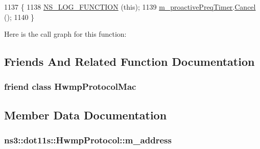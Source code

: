 \begin{DoxyCode}
1137 \{
1138   \hyperlink{log-macros-disabled_8h_a90b90d5bad1f39cb1b64923ea94c0761}{NS\_LOG\_FUNCTION} (\textcolor{keyword}{this});
1139   \hyperlink{classns3_1_1dot11s_1_1HwmpProtocol_a9788adc340b2abf12aae651c911bd74f}{m\_proactivePreqTimer}.\hyperlink{classns3_1_1EventId_a993ae94e48e014e1afd47edb16db7a11}{Cancel} ();
1140 \}
\end{DoxyCode}


Here is the call graph for this function\+:




\subsection{Friends And Related Function Documentation}
\subsubsection[{\texorpdfstring{Hwmp\+Protocol\+Mac}{HwmpProtocolMac}}]{\setlength{\rightskip}{0pt plus 5cm}friend class {\bf Hwmp\+Protocol\+Mac}\hspace{0.3cm}{\ttfamily [friend]}}\hypertarget{classns3_1_1dot11s_1_1HwmpProtocol_a56ef929e9b9723614942cd480b041c27}{}\label{classns3_1_1dot11s_1_1HwmpProtocol_a56ef929e9b9723614942cd480b041c27}


\subsection{Member Data Documentation}
\subsubsection[{\texorpdfstring{m\+\_\+address}{m_address}}]{ ns3\+::dot11s\+::\+Hwmp\+Protocol\+::m\+\_\+address\hspace{0.3cm}{\ttfamily [private]}}\hypertarget{classns3_1_1dot11s_1_1HwmpProtocol_abe24aa7305ec320810e4a0343ca9b25a}{}\label{classns3_1_1dot11s_1_1HwmpProtocol_abe24aa7305ec320810e4a0343ca9b25a}


